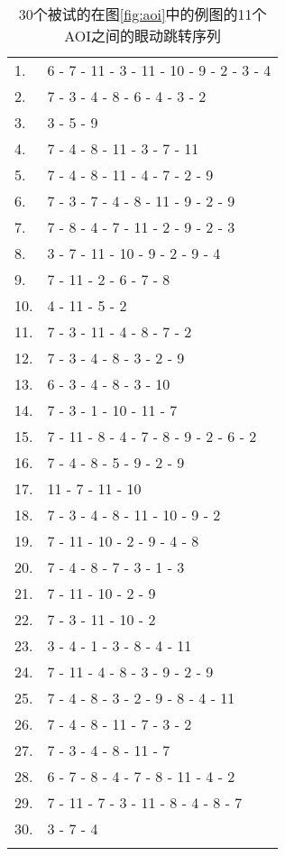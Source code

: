 \begin{table}[H]
  \begin{tabular}{ll}
    1. & 6 - 7 - 11 - 3 - 11 - 10 - 9 - 2 - 3 - 4\\
    2. & 7 - 3 - 4 - 8 - 6 - 4 - 3 - 2\\
    3. & 3 - 5 - 9\\
    4. & 7 - 4 - 8 - 11 - 3 - 7 - 11\\
    5. & 7 - 4 - 8 - 11 - 4 - 7 - 2 - 9\\
    6. & 7 - 3 - 7 - 4 - 8 - 11 - 9 - 2 - 9\\
    7. & 7 - 8 - 4 - 7 - 11 - 2 - 9 - 2 - 3\\
    8. & 3 - 7 - 11 - 10 - 9 - 2 - 9 - 4\\
    9. & 7 - 11 - 2 - 6 - 7 - 8\\
    10.& 4 - 11 - 5 - 2\\
    11.& 7 - 3 - 11 - 4 - 8 - 7 - 2\\
    12.& 7 - 3 - 4 - 8 - 3 - 2 - 9\\
    13.& 6 - 3 - 4 - 8 - 3 - 10\\
    14.& 7 - 3 - 1 - 10 - 11 - 7\\
    15.& 7 - 11 - 8 - 4 - 7 - 8 - 9 - 2 - 6 - 2\\
    16.& 7 - 4 - 8 - 5 - 9 - 2 - 9\\
    17.& 11 - 7 - 11 - 10\\
    18.& 7 - 3 - 4 - 8 - 11 - 10 - 9 - 2\\
    19.& 7 - 11 - 10 - 2 - 9 - 4 - 8\\
    20.& 7 - 4 - 8 - 7 - 3 - 1 - 3\\
    21.& 7 - 11 - 10 - 2 - 9\\
    22.& 7 - 3 - 11 - 10 - 2\\
    23.& 3 - 4 - 1 - 3 - 8 - 4 - 11\\
    24.& 7 - 11 - 4 - 8 - 3 - 9 - 2 - 9\\
    25.& 7 - 4 - 8 - 3 - 2 - 9 - 8 - 4 - 11\\
    26.& 7 - 4 - 8 - 11 - 7 - 3 - 2 \\
    27.& 7 - 3 - 4 - 8 - 11 - 7\\
    28.& 6 - 7 - 8 - 4 - 7 - 8 - 11 - 4 - 2\\
    29.& 7 - 11 - 7 - 3 - 11 - 8 - 4 - 8 - 7\\
    30.& 3 - 7 - 4\\
    \\
  \end{tabular}
  \caption{30个被试的在图\ref{fig:aoi}中的例图的11个AOI之间的眼动跳转序列}
  \label{tab:seq}
\end{table}

